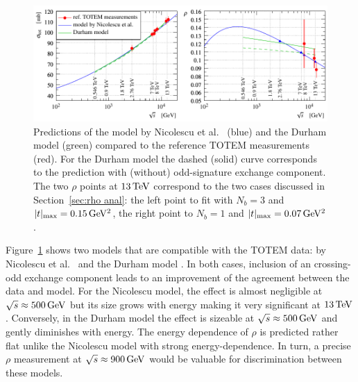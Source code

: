 \begin{figure}
\vskip-5mm
\begin{center}
\includegraphics{fig/matching_models_si_tot_rho.pdf}
\caption{%
Predictions of the model by Nicolescu et al.~\cite{nicolescu-2017} (blue) and the Durham model \cite{durham-2017-note} (green) compared to the reference TOTEM measurements (red). For the Durham model the dashed (solid) curve corresponds to the prediction with (without) odd-signature exchange component. The two $\rho$ points at $13\,{\rm TeV}$ correspond to the two cases discussed in Section~\ref{sec:rho anal}: the left point to fit with $N_b=3$ and $|t|_{\rm max} = 0.15\,{\rm GeV^2}$, the right point to $N_b=1$ and $|t|_{\rm max} = 0.07\,{\rm GeV^2}$.
}
\label{fig:match models}
\end{center}
\end{figure}

Figure~\ref{fig:match models} shows two models that are compatible with the TOTEM data: by Nicolescu et al.~\cite{nicolescu-2017} and the Durham model \cite{durham-2017-note}. In both cases, inclusion of an crossing-odd exchange component leads to an improvement of the agreement between the data and model. For the Nicolescu model, the effect is almost negligible at $\sqrt s \approx 500\,{\rm GeV}$ but its size grows with energy making it very significant at $13\,{\rm TeV}$. Conversely, in the Durham model the effect is sizeable at $\sqrt s \approx 500\,{\rm GeV}$ and gently diminishes with energy. The energy dependence of $\rho$ is predicted rather flat unlike the Nicolescu model with strong energy-dependence. In turn, a precise $\rho$ measurement at $\sqrt s \approx 900\,{\rm GeV}$ would be valuable for discrimination between these models.
